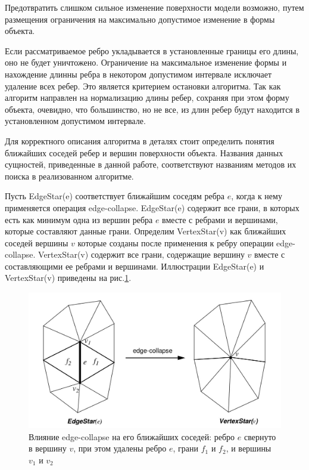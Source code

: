 \documentclass[14pt]{article}
\numberwithin{figure}{section}
\numberwithin{equation}{section}
\begin{document}
Предотвратить слишком сильное изменение поверхности модели возможно, путем размещения ограничения на максимально допустимое изменение в формы объекта.

Если рассматриваемое ребро укладывается в установленные границы его длины, оно не будет уничтожено. Ограничение на максимальное изменение формы и нахождение длинны ребра в некотором допустимом интервале исключает удаление всех ребер. Это является критерием остановки алгоритма. Так как алгоритм направлен на нормализацию длины ребер, сохраняя при этом форму объекта, очевидно, что большинство, но не все, из длин ребер будут находится в установленном допустимом интервале.

Для корректного описания алгоритма в деталях стоит определить понятия ближайших соседей ребер и вершин поверхности объекта. Названия данных сущностей, приведенные в данной работе, соответствуют названиям методов их поиска в реализованном алгоритме.

Пусть EdgeStar(e) соответствует ближайшим соседям ребра $e$, когда к нему применяется операция edge-collapse. EdgeStar(e) содержит все грани, в которых есть как минимум одна из вершин ребра $e$ вместе с ребрами и вершинами, которые составляют данные грани. Определим VertexStar(v) как ближайших соседей вершины $v$ которые созданы после применения к ребру операции edge-collapse. VertexStar(v) содержит все грани, содержащие вершину $v$ вместе с составляющими ее ребрами и вершинами. Иллюстрации EdgeStar(e) и VertexStar(v) приведены на рис.\ref{ris:mc2}.

\begin{figure}
	\begin{center}
		\includegraphics[scale = 0.3]{mc2.JPG}
		\caption{Влияние edge-collapse на его ближайших соседей: ребро $e$ свернуто в вершину $v$, при этом удалены ребро $e$, грани $f_1$ и $f_2$, и вершины $v_1$ и $v_2$}
		\label{ris:mc2}
	\end{center}
\end{figure}
\end{document}
